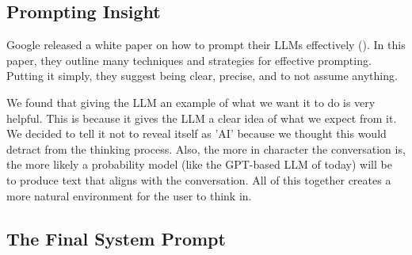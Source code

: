 \documentclass[letterpaper,11pt,leqno]{article}
\begin{document}
\subsection{Prompting Insight}

Google released a white paper on how to prompt their LLMs effectively (\cite{PromptEngineering}). In this paper, they outline many techniques and strategies for effective prompting. Putting it simply, they suggest being clear, precise, and to not assume anything. 

We found that giving the LLM an example of what we want it to do is very helpful. This is because it gives the LLM a clear idea of what we expect from it. We decided to tell it not to reveal itself as 'AI' because we thought this would detract from the thinking process. Also, the more in character the conversation is, the more likely a probability model (like the GPT-based LLM of today) will be to produce text that aligns with the conversation. All of this together creates a more natural environment for the user to think in.

\subsection{The Final System Prompt}
\end{document}
